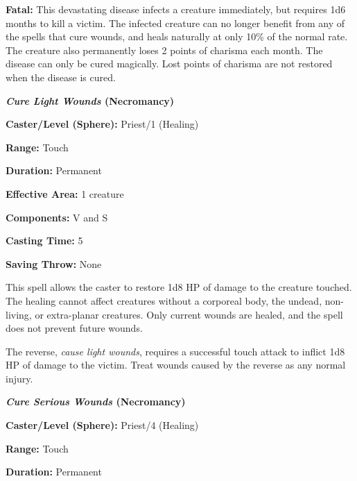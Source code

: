 \begin{multicols}{2}
\textbf{Fatal:} This devastating disease infects a creature immediately, but requires 1d6 months to kill a victim.  The infected creature can no longer benefit from any of the spells that cure wounds, and heals naturally at only 10\% of the normal rate.  The creature also permanently loses 2 points of charisma each month.  The disease can only be cured magically.  Lost points of charisma are not restored when the disease is cured.

\columnbreak

\vspace{1em}

\noindent
\begin{minipage}{\columnwidth}

\noindent \textbf{\textit{Cure Light Wounds} (Necromancy)}

\noindent \textbf{Caster/Level (Sphere):} Priest/1 (Healing)

\noindent \textbf{Range:} Touch

\noindent \textbf{Duration:} Permanent

\noindent \textbf{Effective Area:} 1 creature

\noindent \textbf{Components:} V and S

\noindent \textbf{Casting Time:} 5

\noindent \textbf{Saving Throw:} None

\end{minipage}

This spell allows the caster to restore 1d8 HP of damage to the creature touched.  The healing cannot affect creatures without a corporeal body, the undead, non-living, or extra-planar creatures.  Only current wounds are healed, and the spell does not prevent future wounds.

The reverse, \textit{cause light wounds}, requires a successful touch attack to inflict 1d8 HP of damage to the victim.  Treat wounds caused by the reverse as any normal injury.

\vspace{1em}

\noindent
\begin{minipage}{\columnwidth}

\noindent \textbf{\textit{Cure Serious Wounds} (Necromancy)}

\noindent \textbf{Caster/Level (Sphere):} Priest/4 (Healing)

\noindent \textbf{Range:} Touch

\noindent \textbf{Duration:} Permanent


\end{minipage}
\end{multicols}
